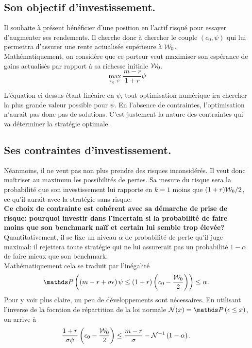\documentclass{article}
\numberwithin{equation}{section}
\begin{document}
\subsection{Son objectif d'investissement.}

Il souhaite à présent bénéficier d'une position en l'actif risqué pour essayer d'augmenter ses rendements. Il cherche donc à chercher le couple $(c_0, \psi)$ qui lui permettra d'assurer une rente actualisée supérieure à $\mathcal{W}_0$.\\

Mathématiquement, on considère que ce porteur veut maximiser son espérance de gains actualisés par rapport à sa richesse initiale $\mathcal{W}_0$.
\begin{equation}
\max_{c_0, \psi} \frac{m - r}{1 + r}\psi
\end{equation}

L'équation ci-dessus étant linéaire en $\psi$, tout optimisation numérique ira chercher la plus grande valeur possible pour $\psi$. En l'absence de contraintes, l'optimisation n'aurait pas donc pas de solutions. C'est justement la nature des contraintes qui va déterminer la stratégie optimale.

\subsection{Ses contraintes d'investissement.}

Néanmoins, il ne veut pas non plus prendre des risques inconsidérés. Il veut donc maîtriser au maximum les possibilités de pertes. Sa mesure du risque sera la probabilité que son investissement lui rapporte en $k = 1$ moins que $(1 + r)\mathcal{W}_0/2$, ce qu'il aurait avec la stratégie sans risque.\\

\textbf{\color{awesomePurple}Ce choix de contrainte est cohérent avec sa démarche de prise de risque: pourquoi investir dans l'incertain si la probabilité de faire moins que son benchmark naïf et certain lui semble trop élevée?}\\

Quantitativement, il se fixe un niveau $\alpha$ de probabilité de perte qu'il juge maximal: il rejettera toute stratégie qui ne lui assurerait pas un probabilité $1 - \alpha$ de faire mieux que son benchmark.\\

Mathématiquement cela se traduit par l'inégalité
$$
\mathds P\left( \left(m - r + \sigma\epsilon\right)\psi \leq \left(1 + r\right)\left( c_0 - \frac{\W_0}{2} \right) \right) \leq \alpha.
$$
Pour y voir plus claire, un peu de développements sont nécessaires. En utilisant l'inverse de la focntion de répartition de la loi normale $\N(x) = \mathds P\left(\epsilon\leq x\right)$, on arrive à
\begin{equation}\label{eq:risk-ineq}
\frac{1+r}{\sigma\psi}\left( c_0 - \frac{\mathcal{W}_0}{2} \right) \leq \frac{m - r}{\sigma} - \mathcal{N}^{-1}\left( 1 - \alpha\right).
\end{equation}
\end{document}
